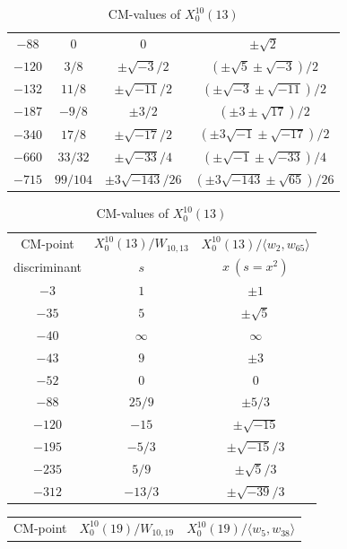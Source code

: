 \documentclass{amsart}
\theoremstyle{definition}
\begin{document}
\begin{appendices}
\begin{table}
\begin{tabular}{|c|c|c|c|}
${-88}$ & $0$ & $0$ & $\pm \sqrt{2}$ \\
${-120}$ & ${3}/{8}$ & $\pm{ \sqrt{-3}}/{2}$ & $(\pm 
\sqrt{5}\pm \sqrt{-3})/{2}$ \\ 
${-132}$ & ${11}/{8}$ & $\pm{ \sqrt{-11}}/{2}$ & $(\pm 
\sqrt{-3}\pm \sqrt{-11})/{2}$ \\ 
${-187}$ & $-{9}/{8}$ & $\pm{ 3}/{2}$ & $(\pm 3\pm 
\sqrt{17})/{2}$ \\ 
${-340}$ & ${17}/{8}$ & $\pm{ \sqrt{-17}}/{2}$ & $(\pm
3\sqrt{-1}\pm \sqrt{-17})/{2}$ \\ 
${-660}$ & ${33}/{32}$ & $\pm{ \sqrt{-33}}/{4}$ & $(\pm \sqrt{-1}\pm \sqrt{-33})/{4}$ \\ 
${-715}$ & ${99}/{104}$ & $\pm{ 3\sqrt{-143}%
}/{26}$ & $(\pm 3\sqrt{-143}\pm \sqrt{65})/{26}$ \\ \hline
\end{tabular}
\bigskip
\caption{CM-values of $X^{10}_0(11)$}



\renewcommand{\arraystretch}{1.5}
\tabcolsep=10pt                         
\begin{tabular}{|c|c|c|}
\hline
CM-point& $X_{0}^{10}\left( 13\right) /W_{10,13}$ & $X_{0}^{10}\left( 13\right)/\langle w_{2}, w_{65} \rangle $ \\ 

discriminant & $s$ & $x\ (s=x^2)$ \\ \hline
${-3}$ & $1$ & $\pm 1$ \\
${-35}$ & $5$ & $\pm\sqrt{5}$ \\ 
${-40}$ & $\infty $ & $\infty$ \\ 
${-43}$ & $9$ & $\pm 3$ \\ 
${-52}$ & $0$ & $0$ \\ 
${-88}$ & ${25}/{9}$ & $\pm{5}/{3}$ \\ 
${-120}$ & $-15$ & $\pm \sqrt{-15}$ \\ 
${-195}$ & $-{5}/{3}$ & $\pm{ \sqrt{-15}}/{3}$ \\ 
${-235}$ & ${5}/{9}$ & $\pm{ \sqrt{5}}/{3}$ \\ 
${-312}$ & $-{13}/{3}$ & $\pm{ \sqrt{-39}}/{3}$ \\ \hline
\end{tabular}
\bigskip
\caption{CM-values of $X^{10}_0(13)$}
\end{table}

\renewcommand{\arraystretch}{1.5}
\tabcolsep=10pt                         
\begin{table}
\begin{tabular}{|c|c|c|}
\hline
CM-point& $X_{0}^{10}\left( 19\right) /W_{10,19}$ & $X_{0}^{10}\left( 19\right)/\langle w_{5}, w_{38} \rangle $ \\ 


\end{tabular}
\end{table}
\end{appendices}
\end{document}
